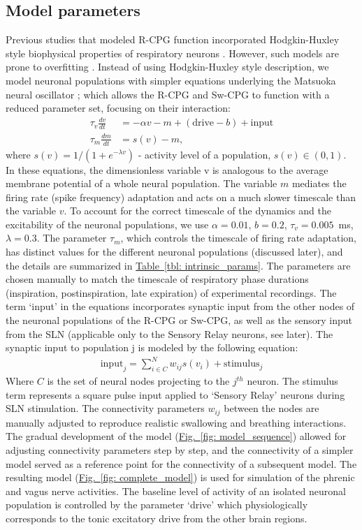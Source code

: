 \documentclass[pdflatex,sn-mathphys-ay]{sn-jnl}%
\renewcommand{\figureautorefname}{Fig.}
\renewcommand{\tableautorefname}{Table}
\newcommand{\Figref}[2][]{\hyperref[#2]{\figureautorefname~\ref*{#2}#1}}
\newcommand{\Tableref}[2][]{\hyperref[#2]{\tableautorefname~\ref*{#2}#1}}
\theoremstyle{thmstyleone}%
\theoremstyle{thmstyletwo}%
\theoremstyle{thmstylethree}%
\begin{document}
\subsection{Model parameters}
Previous studies that modeled R-CPG function incorporated Hodgkin-Huxley style biophysical properties of respiratory neurons \citep{smith2007spatial, rubin2009multiple, molkov2013control, molkov2014closed, molkov2017computational}. However, such models are prone to overfitting \citep{del2018breathing}. Instead of using Hodgkin-Huxley style description, we model neuronal populations with simpler equations underlying the Matsuoka neural oscillator \citep{matsuoka2011analysis}; which allows the R-CPG and Sw-CPG to function with a reduced parameter set, focusing on their interaction:
\begin{align*}
 \tau_v \frac{dv}{dt} &= -\alpha v - m + (\text{drive} - b)+\text{input} \\
 \tau_m \frac{dm}{dt} &= s(v) - m, 
\end{align*}
where $s(v) = 1/(1+e^{-\lambda v} )$ - activity level of a population, $s(v) \in (0,1)$.
In these equations, the dimensionless variable v is analogous to the average membrane potential of a whole neural population. The variable $m$ mediates the firing rate (spike frequency) adaptation and acts on a much slower timescale than the variable $v$. To account for the correct timescale of the dynamics and the excitability of the neuronal populations, we use $\alpha=0.01$, $b=0.2$, $\tau_v=0.005$~ms, $\lambda=0.3$. The parameter $\tau_m$, which controls the timescale of firing rate adaptation, has distinct values for the different neuronal populations (discussed later), and the details are summarized in \Tableref{tbl: intrinsic_params}. The parameters are chosen manually to match the timescale of respiratory phase durations (inspiration, postinspiration, late expiration) of experimental recordings.
The term `input' in the equations incorporates synaptic input from the other nodes of the neuronal populations of the R-CPG or Sw-CPG, as well as the sensory input from the SLN (applicable only to the Sensory Relay neurons, see later). The synaptic input to population j is modeled by the following equation:
\begin{align*}
 \text{input}_j = \sum_{i \in C}^N w_{ij} s(v_i) +\text{stimulus}_j 
\end{align*}
Where $C$ is the set of neural nodes projecting to the $j^{th}$ neuron.
The stimulus term represents a square pulse input applied to `Sensory Relay' neurons during SLN stimulation.
The connectivity parameters $w_{ij}$ between the nodes are manually adjusted to reproduce realistic swallowing and breathing interactions. The gradual development of the model (\Figref[]{fig: model_sequence}) allowed for adjusting connectivity parameters step by step, and the connectivity of a simpler model served as a reference point for the connectivity of a subsequent model. The resulting model (\Figref[]{fig: complete_model}) is used for simulation of the phrenic and vagus nerve activities. The baseline level of activity of an isolated neuronal population is controlled by the parameter `drive' which physiologically corresponds to the tonic excitatory drive from the other brain regions.
\end{document}
